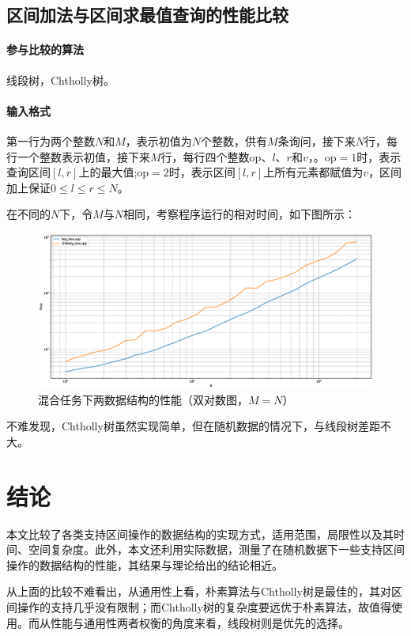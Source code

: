 \documentclass{cjc}
\begin{document}
\subsection{区间加法与区间求最值查询的性能比较}
\paragraph{参与比较的算法} 线段树，Chtholly树。
\paragraph{输入格式} 第一行为两个整数$N$和$M$，表示初值为$N$个整数，供有$M$条询问，接下来$N$行，每行一个整数表示初值，接下来$M$行，每行四个整数$\text{op}$、$l$、$r$和$v$，。$\text{op}=1$时，表示查询区间$[l,r]$上的最大值;$\text{op}=2$时，表示区间$[l,r]$上所有元素都赋值为$v$，区间加上保证$0\leq l \leq r \leq N$。

在不同的$N$下，令$M$与$N$相同，考察程序运行的相对时间，如下图所示：
\begin{figure}[H]
  \centering
  \includegraphics[width=\linewidth]{images/performance3.eps}
  \caption{混合任务下两数据结构的性能（双对数图，$M=N$）}
\end{figure}

不难发现，Chtholly树虽然实现简单，但在随机数据的情况下，与线段树差距不大。

\section{结论}

本文比较了各类支持区间操作的数据结构的实现方式，适用范围，局限性以及其时间、空间复杂度。此外，本文还利用实际数据，测量了在随机数据下一些支持区间操作的数据结构的性能，其结果与理论给出的结论相近。

从上面的比较不难看出，从通用性上看，朴素算法与Chtholly树是最佳的，其对区间操作的支持几乎没有限制；而Chtholly树的复杂度要远优于朴素算法，故值得使用。而从性能与通用性两者权衡的角度来看，线段树则是优先的选择。
\end{document}
